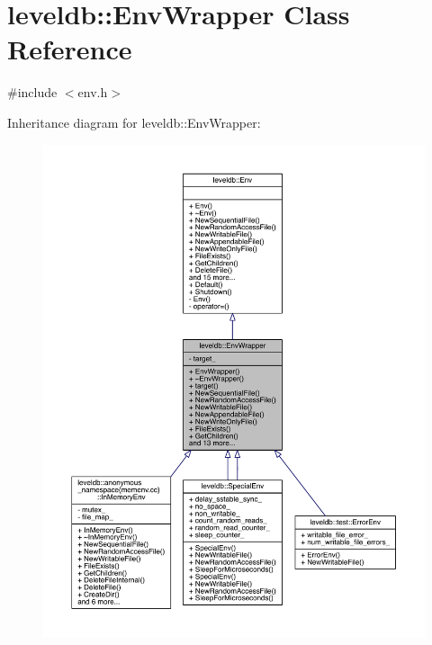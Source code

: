\hypertarget{classleveldb_1_1_env_wrapper}{}\section{leveldb\+:\+:Env\+Wrapper Class Reference}
\label{classleveldb_1_1_env_wrapper}


{\ttfamily \#include $<$env.\+h$>$}



Inheritance diagram for leveldb\+:\+:Env\+Wrapper\+:
\nopagebreak
\begin{figure}[H]
\begin{center}
\leavevmode
\includegraphics[width=350pt]{classleveldb_1_1_env_wrapper__inherit__graph}
\end{center}
\end{figure}


